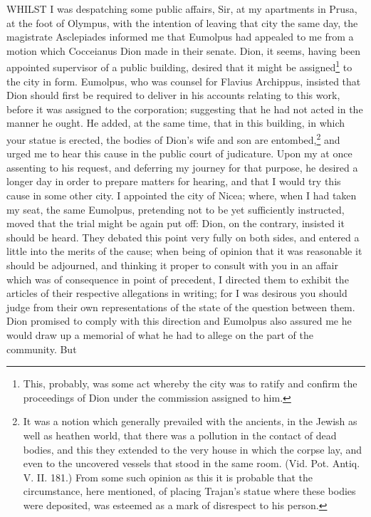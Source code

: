 
WHILST I was despatching some public affairs, Sir, at my apartments in
Prusa, at the foot of Olympus, with the intention of leaving that city the
same day, the magistrate Asclepiades informed me that Eumolpus had
appealed to me from a motion which Cocceianus Dion made in their senate.
Dion, it seems, having been appointed supervisor of a public building,
desired that it might be assigned\footnote{This, probably, was
some act whereby the city was to ratify and confirm the proceedings of
Dion under the commission assigned to him.} to the city in
form. Eumolpus, who was counsel for Flavius Archippus, insisted that Dion
should first be required to deliver in his accounts relating to this work,
before it was assigned to the corporation; suggesting that he had not
acted in the manner he ought. He added, at the same time, that in this
building, in which your statue is erected, the bodies of Dion's wife and
son are entombed,\footnote{It was a notion which
generally prevailed with the ancients, in the Jewish as well as heathen
world, that there was a pollution in the contact of dead bodies, and this
they extended to the very house in which the corpse lay, and even to the
uncovered vessels that stood in the same room. (Vid. Pot. Antiq. V. II.
181.) From some such opinion as this it is probable that the circumstance,
here mentioned, of placing Trajan's statue where these bodies were
deposited, was esteemed as a mark of disrespect to his person.} and urged me to hear this cause in the
public court of judicature. Upon my at once assenting to his request, and
deferring my journey for that purpose, he desired a longer day in order to
prepare matters for hearing, and that I would try this cause in some other
city. I appointed the city of Nicea; where, when I had taken my seat, the
same Eumolpus, pretending not to be yet sufficiently instructed, moved
that the trial might be again put off: Dion, on the contrary, insisted it
should be heard. They debated this point very fully on both sides, and
entered a little into the merits of the cause; when being of opinion that
it was reasonable it should be adjourned, and thinking it proper to
consult with you in an affair which was of consequence in point of
precedent, I directed them to exhibit the articles of their respective
allegations in writing; for I was desirous you should judge from their own
representations of the state of the question between them. Dion promised
to comply with this direction and Eumolpus also assured me he would draw
up a memorial of what he had to allege on the part of the community. But
